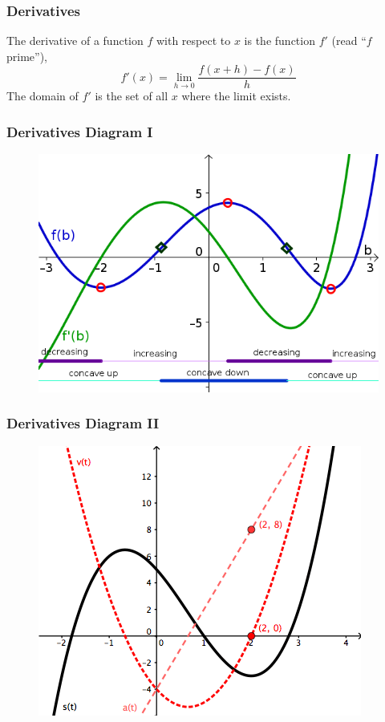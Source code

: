 \documentclass[xcolor=dvipsnames]{beamer}
\begin{document}
\begin{frame}
  \frametitle{Derivatives}
The derivative of a function $f$ with respect to $x$ is the function
$f'$ (read ``$f$ prime''),
\begin{equation}
  \label{eq:lohfasoe}
f'(x)=\lim_{h\rightarrow{}0}\frac{f(x+h)-f(x)}{h}
\end{equation}
The domain of $f'$ is the set of all $x$ where the limit exists.
\end{frame}

\begin{frame}
  \frametitle{Derivatives Diagram I}
  \begin{figure}[h]
    \includegraphics[scale=1.8]{./derivs2.png}
  \end{figure}
\end{frame}

\begin{frame}
  \frametitle{Derivatives Diagram II}
  \begin{figure}[h]
    \includegraphics[scale=.6]{./derivs1.png}
  \end{figure}
\end{frame}
\end{document}
